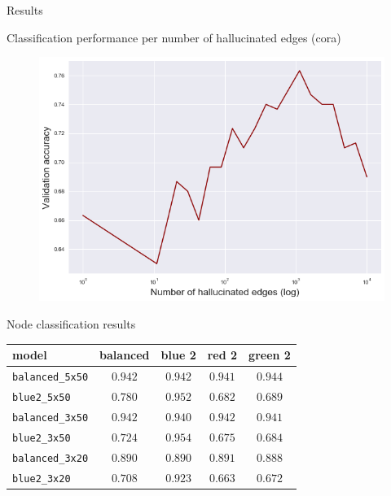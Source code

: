 \documentclass[final]{beamer}
\begin{document}
\begin{frame}[fragile]{}
\begin{textblock}{\colwidth}



\begin{paddedBlock}{Results}

\alert{Classification performance per number of hallucinated edges (cora)}
  \begin{figure}
      \centering
      \includegraphics[width=.8\textwidth]{img/acc_vs_topk.png}
      \label{fig:coins}
  \end{figure}

\alert{Node classification results}

\begin{table}
\centering
\begin{tabular}{lcccc}
\hline

\textbf{model} &  \textbf{balanced} &   \textbf{blue 2} &    \textbf{red 2} &  \textbf{green 2} \\ \hline 
\texttt{balanced\_5x50} &    $0.942$ &  $0.942$ &  $0.941$ &  $0.944$ \\
\texttt{blue2\_5x50} &    $0.780$ &  $0.952$ &  $0.682$ &  $0.689$ \\
\texttt{balanced\_3x50} &    $0.942$ &  $0.940$ &  $0.942$ &  $0.941$ \\
\texttt{blue2\_3x50} &    $0.724$ &  $0.954$ &  $0.675$ &  $0.684$ \\
\texttt{balanced\_3x20} &    $0.890$ &  $0.890$ &  $0.891$ &  $0.888$ \\
\texttt{blue2\_3x20} &    $0.708$ &  $0.923$ &  $0.663$ &  $0.672$ \\
\hline


\end{tabular}
\end{table}
\end{paddedBlock}
\end{textblock}
\end{frame}
\end{document}

